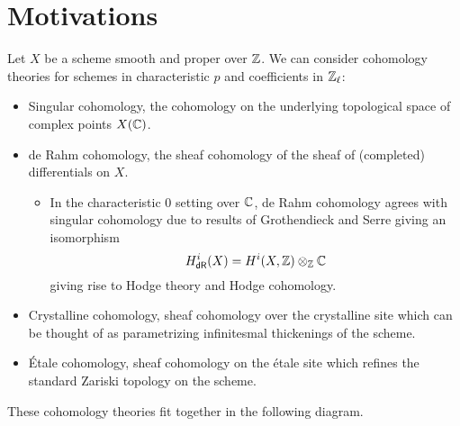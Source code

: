 \section{Motivations}\label{sec: motivations}
Let $X$ be a scheme smooth and proper over $\mathbb{Z}$. We can consider cohomology theories for schemes in characteristic $p$ and coefficients in $\mathbb{Z}_{\ell}$: 
\begin{itemize}
    \item Singular cohomology, the cohomology on the underlying topological space of complex points $X(\mathbb{C})$. 
    \item de Rahm cohomology, the sheaf cohomology of the sheaf of (completed) differentials on $X$. 
    \begin{itemize}
        \item In the characteristic 0 setting over $\mathbb{C}$, de Rahm cohomology agrees with singular cohomology due to results of Grothendieck and Serre giving an isomorphism 
        $$H_{\mathsf{dR}}^{i}(X)=H^{i}(X,\mathbb{Z})\otimes_{\mathbb{Z}}\mathbb{C}$$
        giving rise to Hodge theory and Hodge cohomology. 
    \end{itemize}
    \item Crystalline cohomology, sheaf cohomology over the crystalline site which can be thought of as parametrizing infinitesmal thickenings of the scheme. 
    \item \'{E}tale cohomology, sheaf cohomology on the \'{e}tale site which refines the standard Zariski topology on the scheme. 
\end{itemize}
These cohomology theories fit together in the following diagram. 
